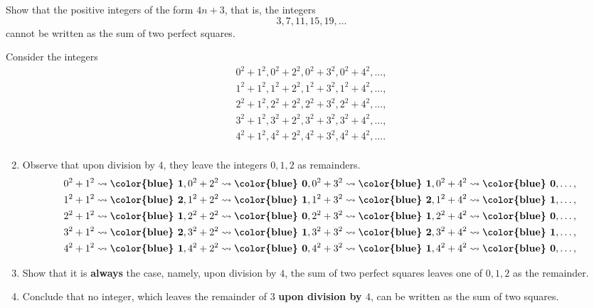 \documentclass[paper=6.125in:9.25in,twoside,openright,pagesize=pdftex,10pt]{scrbook}
\newcommand{\alertb}[1]{\textbf{\color{blue} #1}}
\begin{document}
\begin{problem}
Show that the positive integers of the form $4n+3$, that is, the integers
\[
3, 7, 11, 15, 19, \dots
\]
cannot be written as the sum of two perfect squares. 
\end{problem}


\begin{walk}
	\ii Consider the integers
	\begin{align*}
	0^2 + 1^2, 0^2 + 2^2, 0^2 + 3^2, 0^2 + 4^2, \dots, \\
	1^2 + 1^2, 1^2 + 2^2, 1^2 + 3^2, 1^2 + 4^2, \dots, \\
	2^2 + 1^2, 2^2 + 2^2, 2^2 + 3^2, 2^2 + 4^2, \dots, \\
	3^2 + 1^2, 3^2 + 2^2, 3^2 + 3^2, 3^2 + 4^2, \dots, \\
	4^2 + 1^2, 4^2 + 2^2, 4^2 + 3^2, 4^2 + 4^2, \dots. \\
	\end{align*}

	
\end{walk}

\begin{enumerate}[\bfseries (a)]
  \setcounter{enumi}{1}
\item 
Observe that upon division by $4$, they leave the integers $0, 1, 2$ as remainders. 
	\begin{align*}
	0^2 + 1^2 \rightsquigarrow \alertb{1}, 0^2 + 2^2 \rightsquigarrow \alertb{0}, 0^2 + 3^2 \rightsquigarrow \alertb{1}, 0^2 + 4^2 \rightsquigarrow \alertb{0}, \dots, \\
	1^2 + 1^2 \rightsquigarrow \alertb{2}, 1^2 + 2^2 \rightsquigarrow \alertb{1}, 1^2 + 3^2 \rightsquigarrow \alertb{2}, 1^2 + 4^2 \rightsquigarrow \alertb{1}, \dots, \\
	2^2 + 1^2 \rightsquigarrow \alertb{1}, 2^2 + 2^2 \rightsquigarrow \alertb{0}, 2^2 + 3^2 \rightsquigarrow \alertb{1}, 2^2 + 4^2 \rightsquigarrow \alertb{0}, \dots, \\
	3^2 + 1^2 \rightsquigarrow \alertb{2}, 3^2 + 2^2 \rightsquigarrow \alertb{1}, 3^2 + 3^2 \rightsquigarrow \alertb{2}, 3^2 + 4^2 \rightsquigarrow \alertb{1}, \dots, \\
	4^2 + 1^2 \rightsquigarrow \alertb{1}, 4^2 + 2^2 \rightsquigarrow \alertb{0}, 4^2 + 3^2 \rightsquigarrow \alertb{1}, 4^2 + 4^2 \rightsquigarrow \alertb{0}, \dots, \\
	\end{align*}

\item Show that it is \alertb{always} the case, namely, upon division by $4$,  the sum of two perfect squares leaves one of $0, 1, 2$ as the remainder. 
\item 
Conclude that no integer, which leaves the remainder of $3$ \textbf{\color{magenta}upon division by $4$}, 
can be written as the sum of two squares.

\end{enumerate}
\end{document}
